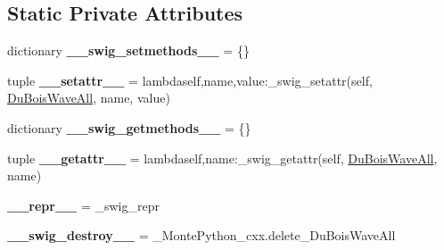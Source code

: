 \subsection*{Static Private Attributes}
\begin{DoxyCompactItemize}
\item 
\hypertarget{classMontePython__cxx_1_1DuBoisWaveAll_ae7869eebda916be712b61c3200b12e19}{}dictionary {\bfseries \+\_\+\+\_\+swig\+\_\+setmethods\+\_\+\+\_\+} = \{\}\label{classMontePython__cxx_1_1DuBoisWaveAll_ae7869eebda916be712b61c3200b12e19}

\item 
\hypertarget{classMontePython__cxx_1_1DuBoisWaveAll_a9925f24332ccfc0b7affe981f1883b70}{}tuple {\bfseries \+\_\+\+\_\+setattr\+\_\+\+\_\+} = lambdaself,name,value\+:\+\_\+swig\+\_\+setattr(self, \hyperlink{classMontePython__cxx_1_1DuBoisWaveAll}{Du\+Bois\+Wave\+All}, name, value)\label{classMontePython__cxx_1_1DuBoisWaveAll_a9925f24332ccfc0b7affe981f1883b70}

\item 
\hypertarget{classMontePython__cxx_1_1DuBoisWaveAll_ab606da2bec42245cc38398c597464b91}{}dictionary {\bfseries \+\_\+\+\_\+swig\+\_\+getmethods\+\_\+\+\_\+} = \{\}\label{classMontePython__cxx_1_1DuBoisWaveAll_ab606da2bec42245cc38398c597464b91}

\item 
\hypertarget{classMontePython__cxx_1_1DuBoisWaveAll_af812e052a7c12d75d0e3d06f1f228fbf}{}tuple {\bfseries \+\_\+\+\_\+getattr\+\_\+\+\_\+} = lambdaself,name\+:\+\_\+swig\+\_\+getattr(self, \hyperlink{classMontePython__cxx_1_1DuBoisWaveAll}{Du\+Bois\+Wave\+All}, name)\label{classMontePython__cxx_1_1DuBoisWaveAll_af812e052a7c12d75d0e3d06f1f228fbf}

\item 
\hypertarget{classMontePython__cxx_1_1DuBoisWaveAll_a544218b3434ac8e35bd07abad3debca4}{}{\bfseries \+\_\+\+\_\+repr\+\_\+\+\_\+} = \+\_\+swig\+\_\+repr\label{classMontePython__cxx_1_1DuBoisWaveAll_a544218b3434ac8e35bd07abad3debca4}

\item 
\hypertarget{classMontePython__cxx_1_1DuBoisWaveAll_a4656662c8f98d62cc2b10ebeb0d0eae7}{}{\bfseries \+\_\+\+\_\+swig\+\_\+destroy\+\_\+\+\_\+} = \+\_\+\+Monte\+Python\+\_\+cxx.\+delete\+\_\+\+Du\+Bois\+Wave\+All\label{classMontePython__cxx_1_1DuBoisWaveAll_a4656662c8f98d62cc2b10ebeb0d0eae7}

\end{DoxyCompactItemize}



